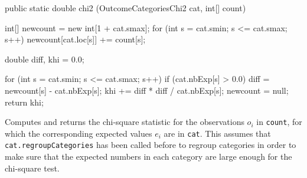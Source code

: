 \begin{code}

   public static double chi2 (OutcomeCategoriesChi2 cat, int[] count)\begin{hide} {
      int[] newcount = new int[1 + cat.smax];
      for (int s = cat.smin; s <= cat.smax; s++) {
         newcount[cat.loc[s]] += count[s];
      }

      double diff, khi = 0.0;

      for (int s = cat.smin; s <= cat.smax; s++) {
         if (cat.nbExp[s] > 0.0) {
            diff = newcount[s] - cat.nbExp[s];
            khi += diff * diff / cat.nbExp[s];
         }
      }
      newcount = null;
      return khi;
   }\end{hide}
\end{code}
\begin{tabb} Computes and returns the chi-square statistic for the
 observations $o_i$ in \texttt{count}, for which the
 corresponding expected values $e_i$ are in \texttt{cat}.
 This assumes that \texttt{cat.regroupCategories} has been called before
 to regroup categories in order to make sure that the expected numbers in each
 category are large enough for the chi-square test.
\end{tabb}
\begin{htmlonly}
\end{htmlonly}
